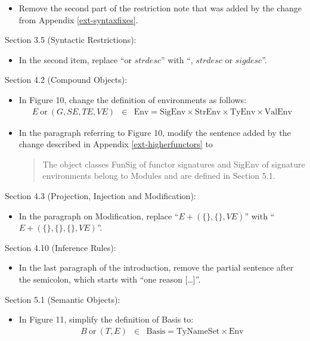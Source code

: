 \documentclass[twoside,titlepage]{article}
\begin{document}
\begin{appendix}
\begin{itemize}
\item Remove the second part of the restriction note that was added by the change from Appendix \ref{ext-syntaxfixes}.
\end{itemize}

Section 3.5 (Syntactic Restrictions):
\begin{itemize}
\item In the second item, replace ``or $\mathit{strdesc}$'' with ``, $\mathit{strdesc}$ or $\mathit{sigdesc}$''.
\end{itemize}

Section 4.2 (Compound Objects):
\begin{itemize}
\item In Figure 10, change the definition of environments as follows:
  \begin{eqnarray*}
  E~\mbox{or}~(G,\mathit{SE},\mathit{TE},\mathit{VE}) &\in& \mbox{Env} = \mbox{SigEnv}\times\mbox{StrEnv}\times\mbox{TyEnv}\times\mbox{ValEnv}
  \end{eqnarray*}

\item In the paragraph referring to Figure 10, modify the sentence added by the change described in Appendix \ref{ext-higherfunctors} to
  \begin{quote}
  The object classes FunSig of functor signatures and SigEnv of signature environments belong to Modules and are defined in Section 5.1.
  \end{quote}
\end{itemize}

Section 4.3 (Projection, Injection and Modification):
\begin{itemize}
\item In the paragraph on Modification, replace ``$E+(\{\},\{\},\mathit{VE})$'' with ``$E+(\{\},\{\},\{\},\mathit{VE})$''.
\end{itemize}

Section 4.10 (Inference Rules):
\begin{itemize}
\item In the last paragraph of the introduction, remove the partial sentence after the semicolon, which starts with ``one reason [\dots]''.
\end{itemize}

Section 5.1 (Semantic Objects):
\begin{itemize}
\item In Figure 11, simplify the definition of Basis to:
  \begin{eqnarray*}
  B~\mbox{or}~(T,E) &\in& \mbox{Basis} = \mbox{TyNameSet}\times\mbox{Env}
  \end{eqnarray*}
\end{itemize}


\end{appendix}
\end{document}
